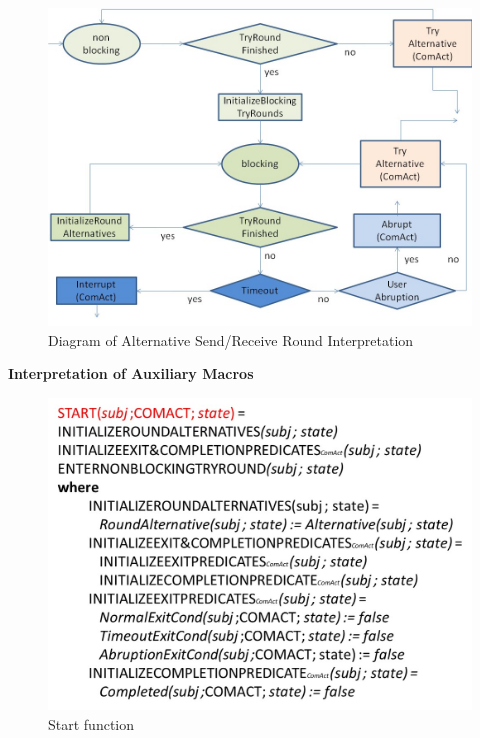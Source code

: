 \begin{figure}[ph]
	\centering
	\includegraphics[width=0.8\linewidth]{20181026-Ontologie-Bilder/Grafiken-Ontologie/SUbjectExecution/ASM-Perform-Bild}
	\caption[Diagram of Alternative Send/Receive Round Interpretation]{Diagram of Alternative Send/Receive Round Interpretation}
	\label{fig:asm-perform-bild}
\end{figure}


\textbf{Interpretation of Auxiliary Macros}
\begin{figure}[ph]
	\centering
	\includegraphics[width=0.8\linewidth]{20181026-Ontologie-Bilder/Grafiken-Ontologie/SUbjectExecution/ASM-Start}
	\caption[Start function]{Start function}
	\label{fig:asm-start}
\end{figure}

